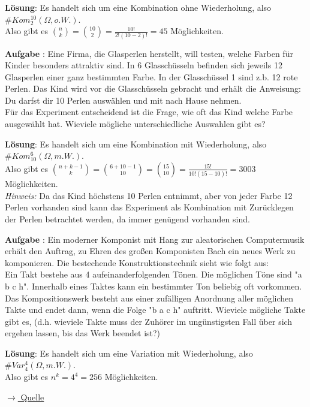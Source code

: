 \documentclass[a4paper,13pt]{scrartcl}
\newcommand{\exercise}{\vspace*{0.2cm}
\stepcounter{aufgabe}
\noindent
\textbf{Aufgabe \arabic{aufgabe}}: }
\newcounter{aufgabe}
\newcommand{\solution}{\vspace*{0.2cm}
\noindent
\textbf{Lösung}: }
\begin{document}
\solution
Es handelt sich um eine Kombination ohne Wiederholung, also $\#Kom_{2}^{10}(\Omega, o. W.)$.\\
Also gibt es $\binom{n}{k} = \binom{10}{2} = \frac{10!}{2!(10-2)!} = 45$ Möglichkeiten.
\vspace{8mm}

\exercise
Eine Firma, die Glasperlen herstellt, will testen, welche Farben für Kinder besonders attraktiv sind. In 6 Glasschüsseln befinden sich jeweils 12 Glasperlen einer ganz bestimmten Farbe. In der Glasschüssel 1 sind z.b. 12 rote Perlen. Das Kind wird vor die Glasschüsseln gebracht und erhält die Anweisung: Du darfst dir 10 Perlen auswählen und mit nach Hause nehmen.\\
Für das Experiment entscheidend ist die Frage, wie oft das Kind welche Farbe ausgewählt hat. Wieviele mögliche unterschiedliche Auswahlen gibt es?
\vspace{4mm}

\solution
Es handelt sich um eine Kombination mit Wiederholung, also $\#Kom_{10}^{6}(\Omega, m. W.)$.\\
Also gibt es $\binom{n+k-1}{k} = \binom{6+10-1}{10} = \binom{15}{10} = \frac{15!}{10!(15-10)!} = 3003$ Möglichkeiten.\\

\textit{Hinweis:} Da das Kind höchstens 10 Perlen entnimmt, aber von jeder Farbe 12 Perlen vorhanden sind kann das Experiment als Kombination mit Zurücklegen der Perlen betrachtet werden, da immer genügend vorhanden sind.
\vspace{8mm}

\exercise
Ein moderner Komponist mit Hang zur aleatorischen Computermusik erhält den Auftrag, zu Ehren des großen Komponisten Bach ein neues Werk zu komponieren. Die bestechende Konstruktionstechnik sieht wie folgt aus:\\
Ein Takt bestehe aus 4 aufeinanderfolgenden Tönen. Die möglichen Töne sind "a b c h". Innerhalb eines Taktes kann ein bestimmter Ton beliebig oft vorkommen. Das Kompositionswerk besteht aus einer zufälligen Anordnung aller möglichen Takte und endet dann, wenn die Folge "b a c h" auftritt. Wieviele mögliche Takte gibt es, (d.h. wieviele Takte muss der Zuhörer im ungünstigsten Fall über sich ergehen lassen, bis das Werk beendet ist?)
\vspace{4mm}

\solution
Es handelt sich um eine Variation mit Wiederholung, also $\#Var_{4}^{4}(\Omega, m. W.)$.\\
Also gibt es $n^k = 4^{4} = 256$ Möglichkeiten.
\vspace{8mm}


\href{https://esb1jockisch.lima-city.de/math/math12/Kombinatorik/test.htm}{$\rightarrow$ Quelle}
\end{document}
